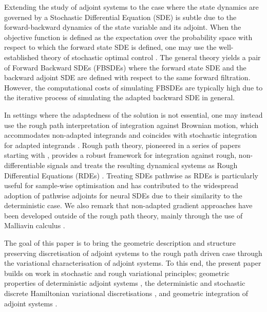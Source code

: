 \documentclass[11pt, oneside]{article}
\numberwithin{equation}{section}
\theoremstyle{definition}
\begin{document}
Extending the study of adjoint systems to the case where the state dynamics are governed by a Stochastic Differential Equation (SDE) is subtle due to the forward-backward dynamics of the state variable and its adjoint. When the objective function is defined as the expectation over the probability space with respect to which the forward state SDE is defined, one may use the well-established theory of stochastic optimal control \cite{Yong1999}. The general theory yields a pair of Forward Backward SDEs (FBSDEs) where the forward state SDE and the backward adjoint SDE are defined with respect to the same forward filtration. However, the computational costs of simulating FBSDEs are typically high due to the iterative process of simulating the adapted backward SDE in general. 

In settings where the adaptedness of the solution is not essential, one may instead use the rough path interpretation of integration against Brownian motion, which accommodates non-adapted integrands and coincides with stochastic integration for adapted integrands \cite{FV10}. Rough path theory, pioneered in a series of papers starting with \cite{lyons1994differential, Lyons1998}, provides a robust framework for integration against rough, non-differentiable signals and treats the resulting dynamical systems as Rough Differential Equations (RDEs) \cite{LCL2007, FH2020}. Treating SDEs pathwise as RDEs is particularly useful for sample-wise optimisation and has contributed to the widespread adoption of pathwise adjoints for neural SDEs \cite{Li2020, Kidger2021, Kidger2022} due to their similarity to the deterministic case. We also remark that non-adapted gradient approaches have been developed outside of the rough path theory, mainly through the use of Malliavin calculus \cite{Fourni1999,Gobet2005, Malliavin2006}.

The goal of this paper is to bring the geometric description and structure preserving discretisation of adjoint systems to the rough path driven case through the variational characterisation of adjoint systems. To this end, the present paper builds on work in stochastic \cite{Holm2015, SC2019} and rough \cite{CHLN2022} variational principles; geometric properties of deterministic adjoint systems \cite{TL2024}, the deterministic and stochastic discrete Hamiltonian variational discretisations \cite{LZ2011, HT2018, HHW2018}, and geometric integration of adjoint systems  \cite{Sanz-Serna2016, TL2024}.
\end{document}
